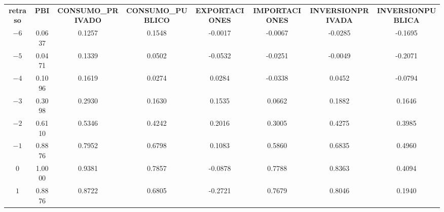 \documentclass[10pt]{article} %
\begin{document}
\begin{table}[!htbp]
\centering
\begin{tabular}{lrrrrrrr}
\multicolumn{1}{|c}{\textbf{retraso}}&\multicolumn{1}{c}{\textbf{PBI}}&\multicolumn{1}{c}{\textbf{CONSUMO\_PRIVADO}}&\multicolumn{1}{c}{\textbf{CONSUMO\_PUBLICO}}&\multicolumn{1}{c}{\textbf{EXPORTACIONES}}&\multicolumn{1}{c}{\textbf{IMPORTACIONES}}&\multicolumn{1}{c}{\textbf{INVERSIONPRIVADA}}&\multicolumn{1}{c|}{\textbf{INVERSIONPUBLICA}}\\
\multicolumn{1}{|c|}{$-6$}&\multicolumn{1}{|c|}{0.0637}&\multicolumn{1}{|c|}{0.1257}&\multicolumn{1}{|c|}{0.1548}&\multicolumn{1}{|c|}{-0.0017}&\multicolumn{1}{|c|}{-0.0067}&\multicolumn{1}{|c|}{-0.0285}&\multicolumn{1}{|c|}{-0.1695}\\
\multicolumn{1}{|c|}{$-5$}&\multicolumn{1}{|c|}{0.0471}&\multicolumn{1}{|c|}{0.1339}&\multicolumn{1}{|c|}{0.0502}&\multicolumn{1}{|c|}{-0.0532}&\multicolumn{1}{|c|}{-0.0251}&\multicolumn{1}{|c|}{-0.0049}&\multicolumn{1}{|c|}{-0.2071}\\
\multicolumn{1}{|c|}{$-4$}&\multicolumn{1}{|c|}{0.1096}&\multicolumn{1}{|c|}{0.1619}&\multicolumn{1}{|c|}{0.0274}&\multicolumn{1}{|c|}{0.0284}&\multicolumn{1}{|c|}{-0.0338}&\multicolumn{1}{|c|}{0.0452}&\multicolumn{1}{|c|}{-0.0794}\\
\multicolumn{1}{|c|}{$-3$}&\multicolumn{1}{|c|}{0.3098}&\multicolumn{1}{|c|}{0.2930}&\multicolumn{1}{|c|}{0.1630}&\multicolumn{1}{|c|}{0.1535}&\multicolumn{1}{|c|}{0.0662}&\multicolumn{1}{|c|}{0.1882}&\multicolumn{1}{|c|}{0.1646}\\
\multicolumn{1}{|c|}{$-2$}&\multicolumn{1}{|c|}{0.6110}&\multicolumn{1}{|c|}{0.5346}&\multicolumn{1}{|c|}{0.4242}&\multicolumn{1}{|c|}{0.2016}&\multicolumn{1}{|c|}{0.3005}&\multicolumn{1}{|c|}{0.4275}&\multicolumn{1}{|c|}{0.3985}\\
\multicolumn{1}{|c|}{$-1$}&\multicolumn{1}{|c|}{0.8876}&\multicolumn{1}{|c|}{0.7952}&\multicolumn{1}{|c|}{0.6798}&\multicolumn{1}{|c|}{0.1083}&\multicolumn{1}{|c|}{0.5860}&\multicolumn{1}{|c|}{0.6835}&\multicolumn{1}{|c|}{0.4960}\\
\multicolumn{1}{|c|}{$0$}&\multicolumn{1}{|c|}{1.0000}&\multicolumn{1}{|c|}{0.9381}&\multicolumn{1}{|c|}{0.7857}&\multicolumn{1}{|c|}{-0.0878}&\multicolumn{1}{|c|}{0.7788}&\multicolumn{1}{|c|}{0.8363}&\multicolumn{1}{|c|}{0.4094}\\
\multicolumn{1}{|c|}{$1$}&\multicolumn{1}{|c|}{0.8876}&\multicolumn{1}{|c|}{0.8722}&\multicolumn{1}{|c|}{0.6805}&\multicolumn{1}{|c|}{-0.2721}&\multicolumn{1}{|c|}{0.7679}&\multicolumn{1}{|c|}{0.8046}&\multicolumn{1}{|c|}{0.1940}\\

\end{tabular}
\end{table}
\end{document}
